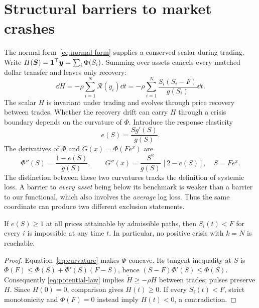 \documentclass[review,hidelinks,onefignum,onetabnum]{siamonline250211}
\begin{document}
\section{Structural barriers to market crashes}\label{sec:barriers}
The normal form~\eqref{eq:normal-form} supplies a conserved scalar during trading. Write $H(\bm S)=\mathbf{1}^\top\bm y=\sum_i\Phi(S_i)$. Summing over assets cancels every matched dollar transfer and leaves only recovery:
\begin{equation}\label{eq:potential-law}
\boxed{\dd H=-\rho\sum_{i=1}^N\mathcal R(y_i)\dd t
=-\rho\sum_{i=1}^N\frac{S_i(S_i-F)}{g(S_i)}\dd t.}
\end{equation}
The scalar $H$ is invariant under trading and evolves through price recovery between trades. Whether the recovery drift can carry $H$ through a crisis boundary depends on the curvature of $\Phi$.
Introduce the response elasticity
\begin{equation}\label{eq:elasticity}
e(S)=\frac{Sg'(S)}{g(S)}.
\end{equation}
The derivatives of $\Phi$ and $G(x)=\Phi(Fe^x)$ are
\begin{equation}\label{eq:curvature}
\Phi''(S)=\frac{1-e(S)}{g(S)},\qquad
G''(x)=\frac{S^2}{g(S)}\,[2-e(S)],\quad S=Fe^x.
\end{equation}
The distinction between these two curvatures tracks the definition of systemic loss. A barrier to \emph{every asset} being below its benchmark is weaker than a barrier to our functional, which also involves the \emph{average} log loss. Thus the same coordinate can produce two different exclusion statements.


\begin{theorem}\label{thm:barrier1}
If $e(S)\ge1$ at all prices attainable by admissible paths, then $S_i(t)<F$ for every $i$ is impossible at any time $t$. In particular, no positive crisis with $k=N$ is reachable.
\end{theorem}
\begin{proof}
Equation~\eqref{eq:curvature} makes $\Phi$ concave. Its tangent inequality at $S$ is $\Phi(F)\le\Phi(S)+\Phi'(S)(F-S)$, hence $(S-F)\Phi'(S)\le\Phi(S)$. Consequently \eqref{eq:potential-law} implies $\dot H\ge-\rho H$ between trades; pulses preserve $H$. Since $H(0)=0$, comparison gives $H(t)\ge0$. If every $S_i(t)<F$, strict monotonicity and $\Phi(F)=0$ instead imply $H(t)<0$, a contradiction.
\end{proof}
\end{document}
